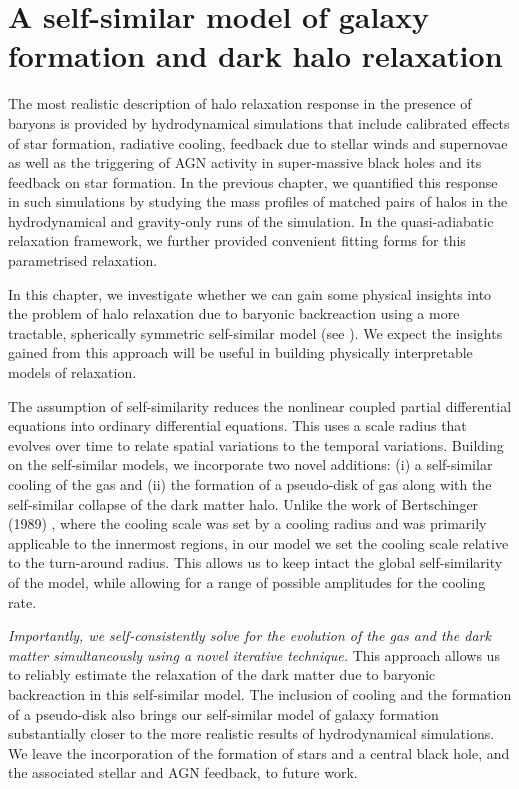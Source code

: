 \chapter{A self-similar model of galaxy formation and dark halo relaxation}
\label{chap:self-sim-relxn}

The most realistic description of halo relaxation response in the presence of baryons is provided by hydrodynamical simulations that include calibrated effects of star formation, radiative cooling, feedback due to stellar winds and supernovae as well as the triggering of AGN activity in super-massive black holes and its feedback on star formation. In the previous chapter, we quantified this response in such simulations by studying the mass profiles of matched pairs of halos in the hydrodynamical and gravity-only runs of the simulation. In the quasi-adiabatic relaxation framework, we further provided convenient fitting forms for this parametrised relaxation.

In this chapter, we investigate whether we can gain some physical insights into the problem of halo relaxation due to baryonic backreaction using a more tractable, spherically symmetric self-similar model (see ). We expect the insights gained from this approach will be useful in building physically interpretable models of relaxation.

The assumption of self-similarity reduces the nonlinear coupled partial differential equations into ordinary differential equations. This uses a scale radius that evolves over time to relate spatial variations to the temporal variations. Building on the self-similar models, we incorporate two novel additions: (i) a self-similar cooling of the gas and (ii) the formation of a pseudo-disk of gas along with the self-similar collapse of the dark matter halo. Unlike the work of Bertschinger (1989) \citep{1989Bertschinger}, where the cooling scale was set by a cooling radius and was primarily applicable to the innermost regions, in our model we set the cooling scale relative to the turn-around radius. This allows us to keep intact the global self-similarity of the model, while allowing for a range of possible amplitudes for the cooling rate.

\emph{Importantly, we self-consistently solve for the evolution of the gas and the dark matter simultaneously using a novel iterative technique.} This approach allows us to reliably estimate the relaxation of the dark matter due to baryonic backreaction in this self-similar model. The inclusion of cooling and the formation of a pseudo-disk also brings our self-similar model of galaxy formation substantially closer to the more realistic results of hydrodynamical simulations. We leave the incorporation of the formation of stars and a central black hole, and the associated stellar and AGN feedback, to future work.

